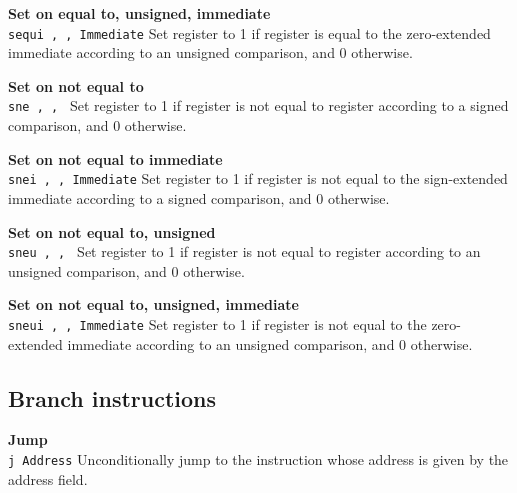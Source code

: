 \noindent
{\bf Set on equal to, unsigned, immediate}\\
\noindent
\texttt{sequi \regd, \regs, Immediate}
Set register \regd{} to 1 if register \regs{} is
equal to the zero-extended immediate according to an unsigned comparison, and 0 otherwise.
\vspace{3ex}

\noindent
{\bf Set on not equal to}\\
\noindent
\texttt{sne \regd, \regs, \regt}
Set register \regd{} to 1 if register \regs{} is
not equal to register \regt{} according to a signed comparison, and 0 otherwise.
\vspace{3ex}

\noindent
{\bf Set on not equal to immediate}\\
\noindent
\texttt{snei \regd, \regs, Immediate}
Set register \regd{} to 1 if register \regs{} is
not equal to the sign-extended immediate according to a signed comparison, and 0 otherwise.
\vspace{3ex}
\newpage

\noindent
{\bf Set on not equal to, unsigned}\\
\noindent
\texttt{sneu \regd, \regs, \regt}
Set register \regd{} to 1 if register \regs{} is
not equal to register \regt{} according to an unsigned comparison, and 0 otherwise.
\vspace{3ex}

\noindent
{\bf Set on not equal to, unsigned, immediate}\\
\noindent
\texttt{sneui \regd, \regs, Immediate}
Set register \regd{} to 1 if register \regs{} is
not equal to the zero-extended immediate according to an unsigned comparison, and 0 otherwise.
\vspace{3ex}

\subsection{Branch instructions}

\noindent
{\bf Jump}\\
\noindent
\texttt{j Address}
Unconditionally jump to the instruction whose address is given by the address field.
\vspace{3ex}

